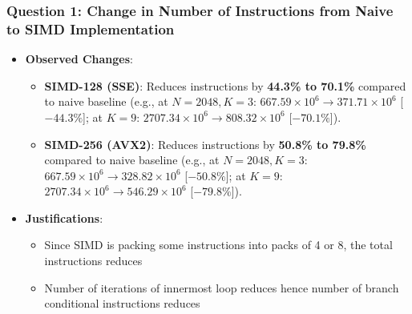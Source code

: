 \documentclass[11pt,a4paper]{article}
\begin{document}
\subsubsection{Question 1: Change in Number of Instructions from Naive to SIMD Implementation}
\begin{itemize}
    \item \textbf{Observed Changes}:
    \begin{itemize}
        \item \textbf{SIMD-128 (SSE)}: Reduces  instructions by \textbf{44.3\% to 70.1\%} compared to naive baseline (e.g., at $N=2048, K=3$: $667.59\times 10^6 \to 371.71\times 10^6$ [$-44.3\%$]; at $K=9$: $2707.34\times 10^6 \to 808.32\times 10^6$ [$-70.1\%$]).
        \item \textbf{SIMD-256 (AVX2)}: Reduces  instructions by \textbf{50.8\% to 79.8\%} compared to naive baseline (e.g., at $N=2048, K=3$: $667.59\times 10^6 \to 328.82\times 10^6$ [$-50.8\%$]; at $K=9$: $2707.34\times 10^6 \to 546.29\times 10^6$ [$-79.8\%$]).
    \end{itemize}
    \item \textbf{Justifications}:
    \begin{itemize}
        \item Since SIMD is packing some instructions into packs of 4 or 8, the total instructions reduces
        \item Number of iterations of innermost loop reduces hence number of branch conditional instructions reduces
    \end{itemize}
\end{itemize}
\end{document}
